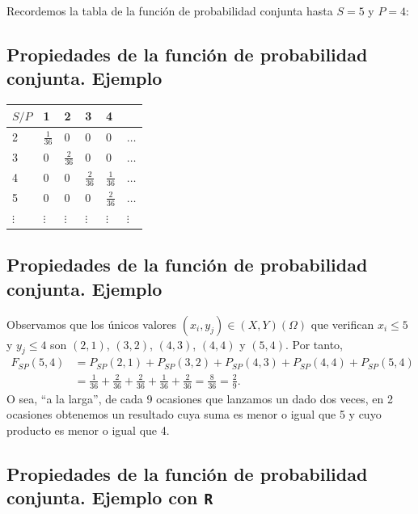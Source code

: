 \documentclass[]{book}
\begin{document}
Recordemos la tabla de la función de probabilidad conjunta hasta \(S=5\) y \(P=4\):

\hypertarget{propiedades-de-la-funciuxf3n-de-probabilidad-conjunta.-ejemplo-1}{%
\subsection{Propiedades de la función de probabilidad conjunta. Ejemplo}\label{propiedades-de-la-funciuxf3n-de-probabilidad-conjunta.-ejemplo-1}}

\begin{longtable}[]{@{}llllll@{}}
\toprule
\(S/P\) & 1 & 2 & 3 & 4 &\tabularnewline
\midrule
\endhead
2 & \(\frac{1}{36}\) & 0 & 0 & 0 & \(\ldots\)\tabularnewline
3 & 0 & \(\frac{2}{36}\) & 0 & 0 & \(\ldots\)\tabularnewline
4 & 0 & 0 & \(\frac{2}{36}\) & \(\frac{1}{36}\) & \(\ldots\)\tabularnewline
5 & 0 & 0 & 0 & \(\frac{2}{36}\) & \(\ldots\)\tabularnewline
\(\vdots\) & \(\vdots\) & \(\vdots\) & \(\vdots\) & \(\vdots\) & \(\vdots\)\tabularnewline
\bottomrule
\end{longtable}

\hypertarget{propiedades-de-la-funciuxf3n-de-probabilidad-conjunta.-ejemplo-2}{%
\subsection{Propiedades de la función de probabilidad conjunta. Ejemplo}\label{propiedades-de-la-funciuxf3n-de-probabilidad-conjunta.-ejemplo-2}}

Observamos que los únicos valores \((x_i,y_j)\in (X,Y)(\Omega)\) que verifican \(x_i\leq 5\) y \(y_j\leq 4\) son \((2,1)\), \((3,2)\), \((4,3)\), \((4,4)\) y \((5,4)\). Por tanto,
\[
\begin{array}{rl}
F_{SP}(5,4) & = P_{SP}(2,1)+P_{SP}(3,2)+P_{SP}(4,3)+P_{SP}(4,4)+P_{SP}(5,4) \\ & = \frac{1}{36}+\frac{2}{36}+\frac{2}{36}+\frac{1}{36}+\frac{2}{36} = \frac{8}{36}=\frac{2}{9}.
\end{array}
\]
O sea, ``a la larga'', de cada 9 ocasiones que lanzamos un dado dos veces, en 2 ocasiones obtenemos un resultado cuya suma es menor o igual que 5 y cuyo producto es menor o igual que 4.

\hypertarget{propiedades-de-la-funciuxf3n-de-probabilidad-conjunta.-ejemplo-con-r}{%
\subsection{\texorpdfstring{Propiedades de la función de probabilidad conjunta. Ejemplo con \texttt{R}}{Propiedades de la función de probabilidad conjunta. Ejemplo con R}}\label{propiedades-de-la-funciuxf3n-de-probabilidad-conjunta.-ejemplo-con-r}}
\end{document}
